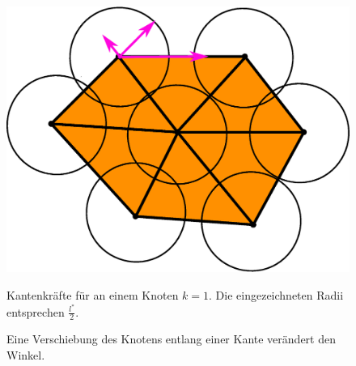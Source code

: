     \begin{figure}
      \begin{minipage}[t]{0.45\textwidth}
      \includegraphics[width=\textwidth]{bilder/meshCorrector/EdgeLaw.eps}
      \caption[Kantenkräfte für optimale Kantenlängen]{Kantenkräfte für an einem Knoten \( k = 1 \). Die eingezeichneten Radii entsprechen \( \frac{l^{*}}{2} \).}
      \label{edgeLaw}
      \end{minipage}
      \hfill
      \begin{minipage}[t]{0.45\textwidth}
      \caption[Winkeländerung durch Verschiebung]{Eine Verschiebung des Knotens entlang einer Kante verändert den Winkel.}
      \label{angleLaw}
      \end{minipage}
    \end{figure}

